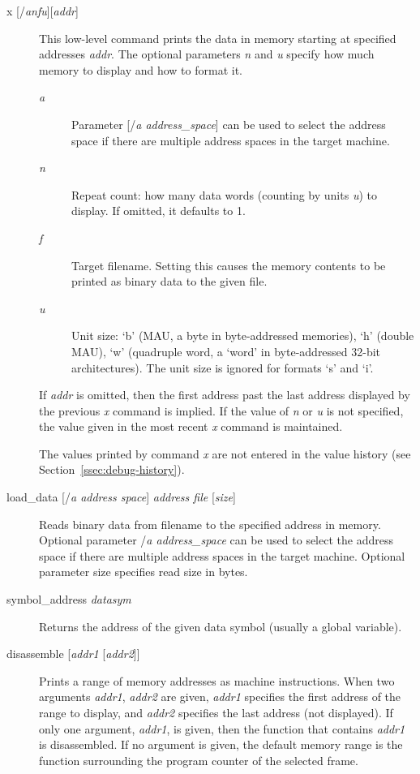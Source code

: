 \documentclass[a4paper,twoside]{tceusermanual}
\begin{document}
\begin{description}
\item[x {[/\emph{anfu}][\emph{addr}]}] %
  This low-level command prints the data in memory starting at specified
  addresses \emph{addr}.  The optional parameters \emph{n} and
  \emph{u} specify how much memory to display and how to format it.
  \begin{description}
  \item[\emph{a}] %
    Parameter [/\emph{a address\_space}] can be used to select the address
    space if there are multiple address spaces in the target machine.
  \item[\emph{n}] %
    Repeat count: how many data words (counting by units \emph{u}) to
    display.  If omitted, it defaults to 1.
  \item[\emph{f}] %
    Target filename. Setting this causes the memory contents to be printed 
    as binary data to the given file.
  \item[\emph{u}] %
    Unit size: `b' (MAU, a byte in byte-addressed memories), `h' (double
    MAU), `w' (quadruple word, a `word' in byte-addressed 32-bit
    architectures).  The unit size is ignored for formats `s' and `i'.
  \end{description}

  If \emph{addr} is omitted, then the first address past the last address
  displayed by the previous \emph{x} command is implied.  If the value of
  \emph{n} or \emph{u} is not specified, the value given in the
  most recent \emph{x} command is maintained.

  The values printed by command \emph{x} are not entered in the value
  history (see Section~\ref{ssec:debug-history}).

\item[load\_data {[/\emph{a address space}] \emph{address file }[\emph{size}]}] %

  Reads binary data from filename to the specified address in memory.
  Optional parameter /\emph{a address\_space} can be used to select the address
  space if there are multiple address spaces in the target machine.
  Optional parameter size specifies read size in bytes.

\item[symbol\_address \emph{datasym} ] %

  Returns the address of the given data symbol (usually
  a global variable). 

\item[disassemble {[\emph{addr1} [\emph{addr2}]]}] %
  Prints a range of memory addresses as machine instructions.  When two
  arguments \emph{addr1}, \emph{addr2} are given, \emph{addr1} specifies the
  first address of the range to display, and \emph{addr2} specifies the last
  address (not displayed).  If only one argument, \emph{addr1}, is given,
  then the function that contains \emph{addr1} is disassembled.  If no
  argument is given, the default memory range is the function surrounding
  the program counter of the selected frame.

\end{description}
\end{document}
